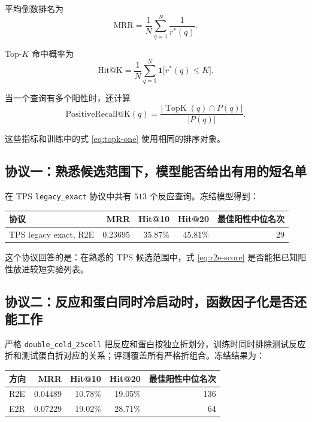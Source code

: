 \documentclass[UTF8,11pt,a4paper]{ctexart}
\begin{document}
平均倒数排名为
\begin{equation}
\mathrm{MRR}
=
\frac1N\sum_{q=1}^{N}\frac1{r^*(q)}.
\label{eq:mrr}
\end{equation}

Top-$K$ 命中概率为
\begin{equation}
\mathrm{Hit@K}
=
\frac1N\sum_{q=1}^{N}
\mathbf 1\big[r^*(q)\le K\big].
\label{eq:hitk}
\end{equation}

当一个查询有多个阳性时，还计算
\begin{equation}
\mathrm{PositiveRecall@K}(q)
=
\frac{|\operatorname{TopK}(q)\cap P(q)|}{|P(q)|}.
\end{equation}

这些指标和训练中的式 \eqref{eq:topk-one} 使用相同的排序对象。

\subsection{协议一：熟悉候选范围下，模型能否给出有用的短名单}

在 TPS \texttt{legacy\_exact} 协议中共有 $513$ 个反应查询。冻结模型得到：

\begin{center}
\begin{tabular}{lrrrr}
\toprule
协议 & MRR & Hit@10 & Hit@20 & 最佳阳性中位名次 \\
\midrule
TPS legacy exact, R2E & 0.23695 & 35.87\% & 45.81\% & 29 \\
\bottomrule
\end{tabular}
\end{center}

这个协议回答的是：在熟悉的 TPS 候选范围中，式 \eqref{eq:r2e-score} 是否能把已知阳性放进较短实验列表。

\subsection{协议二：反应和蛋白同时冷启动时，函数因子化是否还能工作}

严格 \texttt{double\_cold\_25cell} 把反应和蛋白按独立折划分，训练时同时排除测试反应折和测试蛋白折对应的关系；评测覆盖所有严格折组合。冻结结果为：

\begin{center}
\begin{tabular}{lrrrr}
\toprule
方向 & MRR & Hit@10 & Hit@20 & 最佳阳性中位名次 \\
\midrule
R2E & 0.04489 & 10.78\% & 19.05\% & 136 \\
E2R & 0.07229 & 19.02\% & 28.71\% & 64 \\
\bottomrule
\end{tabular}
\end{center}
\end{document}
